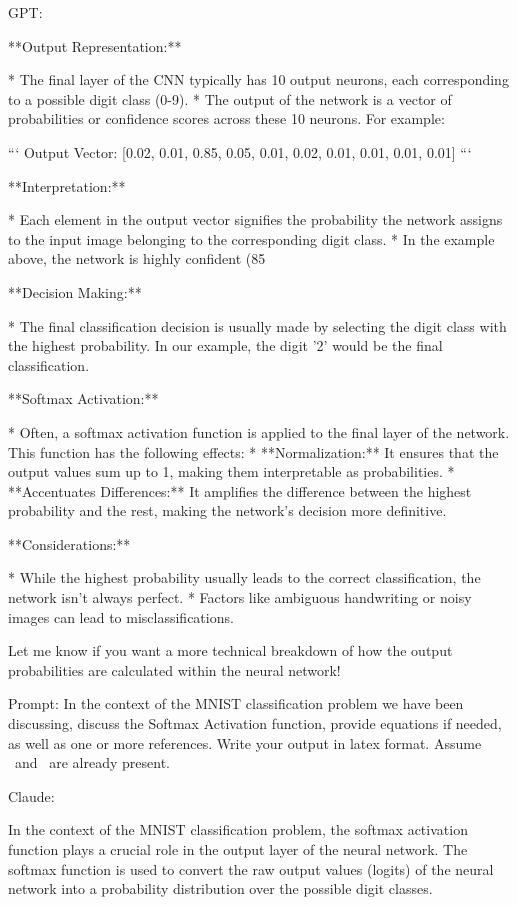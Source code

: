 GPT:

**Output Representation:**

* The final layer of the CNN typically has 10 output neurons, each corresponding to a possible digit class (0-9).
* The output of the network is a vector of probabilities or confidence scores across these 10 neurons. For example:

```
Output Vector: [0.02, 0.01, 0.85, 0.05, 0.01, 0.02, 0.01, 0.01, 0.01, 0.01]
```

**Interpretation:**

* Each element in the output vector signifies the probability the network assigns to the input image belonging to the corresponding digit class.
* In the example above, the network is highly confident (85%

**Decision Making:**

* The final classification decision is usually made by selecting the digit class with the highest probability. In our example, the digit '2' would be the final classification.

**Softmax Activation:**

* Often, a softmax activation function is applied to the final layer of the network. This function has the following effects:
   * **Normalization:** It ensures that the output values sum up to 1, making them interpretable as probabilities.
   * **Accentuates Differences:** It amplifies the difference between the highest probability and the rest,  making the network's decision more definitive.

**Considerations:**

* While the highest probability usually leads to the correct classification, the network isn't always perfect.  
* Factors like ambiguous handwriting or noisy images can lead to misclassifications.

Let me know if you want a more technical breakdown of how the output probabilities are calculated within the neural network! 


Prompt: In the context of the MNIST classification problem we have been discussing, discuss the Softmax Activation function, provide equations if needed, as well as one or more references. Write your output in latex format. Assume \ and \ are already present.


Claude: 

In the context of the MNIST classification problem, the softmax activation function plays a crucial role in the output layer of the neural network. The softmax function is used to convert the raw output values (logits) of the neural network into a probability distribution over the possible digit classes.

